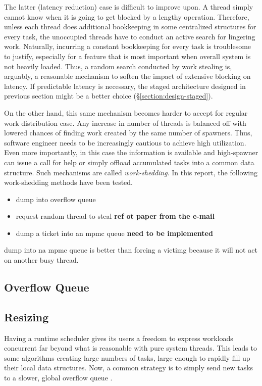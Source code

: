 \documentclass[12pt,a4paper,twoside]{report}
\begin{document}
The latter (latency reduction) case is difficult to improve upon. A thread simply cannot know when it is going to get blocked by a lengthy operation. Therefore, unless each thread does additional bookkeeping in some centralized structures for every task, the unoccupied threads have to conduct an active search for lingering work. Naturally, incurring a constant bookkeeping for every task is troublesome to justify, especially for a feature that is most important when overall system is not heavily loaded. Thus, a random search conducted by work stealing is, arguably, a reasonable mechanism to soften the impact of extensive blocking on latency. If predictable latency is necessary, the staged architecture designed in previous section might be a better choice (\S\ref{section:design-staged}).

On the other hand, this same mechanism becomes harder to accept for regular work distribution case. Any increase in number of threads is balanced off with lowered chances of finding work created by the same number of spawners. Thus, software engineer needs to be increasingly cautious to achieve high utilization. Even more importantly, in this case the information is available and high-spawner can issue a call for help or simply offload accumulated tasks into a common data structure. Such mechanisms are called \textit{work-shedding}. In this report, the following work-shedding methods have been tested. 

\begin{itemize}
    \item dump into overflow queue 
    \item request random thread to steal \textbf{ref ot paper from the e-mail}
    \item dump a ticket into an mpmc queue \textbf{need to be implemented}
\end{itemize}

dump into na mpmc queue is better than forcing a victimg because it will not act on another busy thread. 




\subsection{Overflow Queue}
\label{section:design_overflow_queue}

\subsection{Resizing}
\label{section:resizing}
Having a runtime scheduler gives its users a freedom to express workloads concurrent far beyond what is reasonable with pure system threads. This leads to some algorithms creating large numbers of tasks, large enough to rapidly fill up their local data structures. Now, a common strategy is to simply send new tasks to a slower, global overflow queue .
\end{document}

